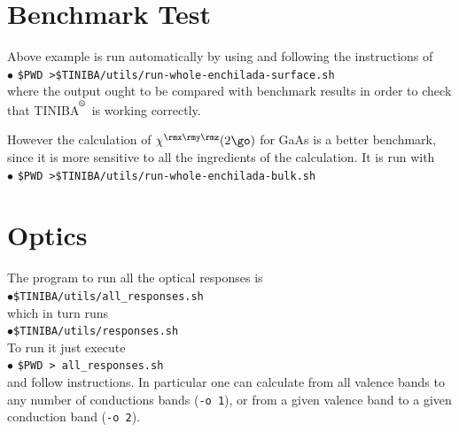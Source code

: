 \documentclass[12pt,leqno]{article}
\def\reg{\textsuperscript{\textregistered}}
\numberwithin{equation}{section}
\begin{document}
\section{Benchmark Test}

Above example is run automatically by using and following the
instructions of\\
$\bullet$ \verb=$PWD >$TINIBA/utils/run-whole-enchilada-surface.sh=\\
where the output ought to be compared with benchmark results in order
to check that TINIBA$^{\reg}$ is working correctly.

However the calculation of $\chi^{\rmx\rmy\rmz}(2\go)$ for GaAs is a
better benchmark, since it is more sensitive to all the ingredients of
the calculation. It is run with\\
$\bullet$ \verb=$PWD >$TINIBA/utils/run-whole-enchilada-bulk.sh=\\

\section{Optics}
 
The program to run all the optical responses is\\
$\bullet$\verb=$TINIBA/utils/all_responses.sh=\\ 
which in turn runs\\
$\bullet$\verb=$TINIBA/utils/responses.sh=\\
To run it just execute\\
$\bullet$ \verb=$PWD > all_responses.sh= \\
and follow instructions. In particular one can calculate from all
valence bands to any number of conductions bands (\verb=-o 1=),
or from a given valence band to a given conduction band (\verb=-o 2=).
\end{document}
